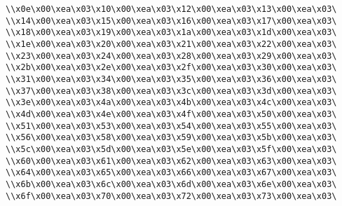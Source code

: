 \verb|\\x0e\x00\xea\x03\x10\x00\xea\x03\x12\x00\xea\x03\x13\x00\xea\x03\|\newline
\verb|\\x14\x00\xea\x03\x15\x00\xea\x03\x16\x00\xea\x03\x17\x00\xea\x03\|\newline
\verb|\\x18\x00\xea\x03\x19\x00\xea\x03\x1a\x00\xea\x03\x1d\x00\xea\x03\|\newline
\verb|\\x1e\x00\xea\x03\x20\x00\xea\x03\x21\x00\xea\x03\x22\x00\xea\x03\|\newline
\verb|\\x23\x00\xea\x03\x24\x00\xea\x03\x28\x00\xea\x03\x29\x00\xea\x03\|\newline
\verb|\\x2b\x00\xea\x03\x2e\x00\xea\x03\x2f\x00\xea\x03\x30\x00\xea\x03\|\newline
\verb|\\x31\x00\xea\x03\x34\x00\xea\x03\x35\x00\xea\x03\x36\x00\xea\x03\|\newline
\verb|\\x37\x00\xea\x03\x38\x00\xea\x03\x3c\x00\xea\x03\x3d\x00\xea\x03\|\newline
\verb|\\x3e\x00\xea\x03\x4a\x00\xea\x03\x4b\x00\xea\x03\x4c\x00\xea\x03\|\newline
\verb|\\x4d\x00\xea\x03\x4e\x00\xea\x03\x4f\x00\xea\x03\x50\x00\xea\x03\|\newline
\verb|\\x51\x00\xea\x03\x53\x00\xea\x03\x54\x00\xea\x03\x55\x00\xea\x03\|\newline
\verb|\\x56\x00\xea\x03\x58\x00\xea\x03\x59\x00\xea\x03\x5b\x00\xea\x03\|\newline
\verb|\\x5c\x00\xea\x03\x5d\x00\xea\x03\x5e\x00\xea\x03\x5f\x00\xea\x03\|\newline
\verb|\\x60\x00\xea\x03\x61\x00\xea\x03\x62\x00\xea\x03\x63\x00\xea\x03\|\newline
\verb|\\x64\x00\xea\x03\x65\x00\xea\x03\x66\x00\xea\x03\x67\x00\xea\x03\|\newline
\verb|\\x6b\x00\xea\x03\x6c\x00\xea\x03\x6d\x00\xea\x03\x6e\x00\xea\x03\|\newline
\verb|\\x6f\x00\xea\x03\x70\x00\xea\x03\x72\x00\xea\x03\x73\x00\xea\x03\|\newline
